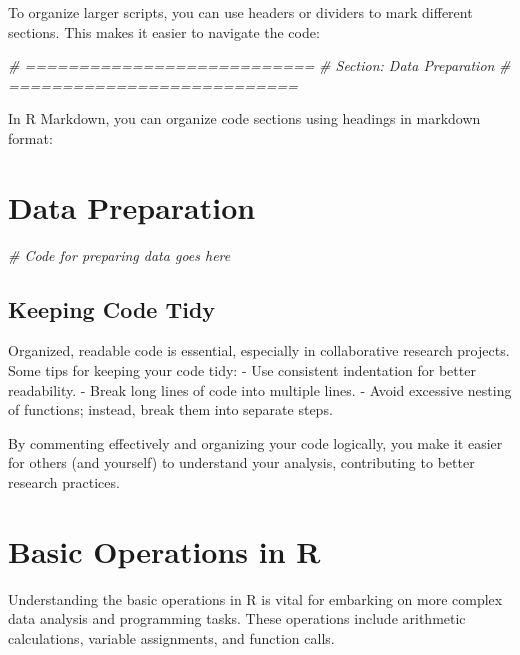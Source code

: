 \documentclass[
]{book}
\newenvironment{Shaded}{\begin{snugshade}}{\end{snugshade}}
\newcommand{\CommentTok}[1]{\textcolor[rgb]{0.56,0.35,0.01}{\textit{#1}}}
\begin{document}
To organize larger scripts, you can use headers or dividers to mark different sections. This makes it easier to navigate the code:

\begin{Shaded}
\begin{Highlighting}[]
\CommentTok{\# ===========================}
\CommentTok{\# Section: Data Preparation}
\CommentTok{\# ===========================}
\end{Highlighting}
\end{Shaded}

In R Markdown, you can organize code sections using headings in markdown format:

\section{Data Preparation}\label{data-preparation}

\begin{Shaded}
\begin{Highlighting}[]
\CommentTok{\# Code for preparing data goes here}
\end{Highlighting}
\end{Shaded}

\subsection*{Keeping Code Tidy}\label{keeping-code-tidy}

Organized, readable code is essential, especially in collaborative research projects. Some tips for keeping your code tidy: - Use consistent indentation for better readability. - Break long lines of code into multiple lines. - Avoid excessive nesting of functions; instead, break them into separate steps.

By commenting effectively and organizing your code logically, you make it easier for others (and yourself) to understand your analysis, contributing to better research practices.

\section{Basic Operations in R}\label{basic-operations-in-r}

Understanding the basic operations in R is vital for embarking on more complex data analysis and programming tasks. These operations include arithmetic calculations, variable assignments, and function calls.
\end{document}

